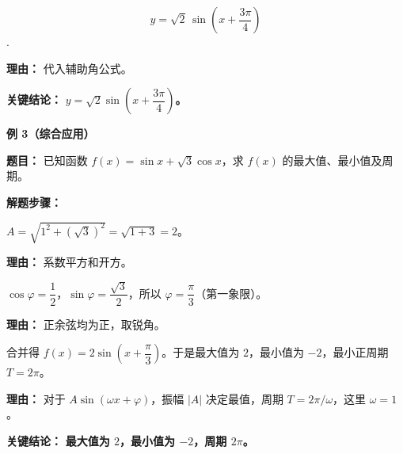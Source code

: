 \begin{examplebox}
\begin{description}[style=nextline, leftmargin=2.8em, labelsep=0.5em, itemsep=0.45em]
		\item[\textbf{第三步（写出合并式）：}]
			\[
				y = \sqrt{2}\,\sin\!\left(x+\frac{3\pi}{4}\right)
			\].
			\par\textbf{理由：} 代入辅助角公式。
	\end{description}

	\textbf{\textcolor{CExample}{关键结论：}}
	\textbf{$y = \sqrt{2}\sin\!\left(x+\dfrac{3\pi}{4}\right)$。}

	\medskip
	\textbf{\textcolor{CExample}{例 3（综合应用）}}

	\textbf{\textcolor{CExample}{题目：}}
	已知函数 $f(x) = \sin x + \sqrt{3}\cos x$，求 $f(x)$ 的最大值、最小值及周期。

	\textbf{\textcolor{CExample}{解题步骤：}}
	\begin{description}[style=nextline, leftmargin=2.8em, labelsep=0.5em, itemsep=0.45em]
		\item[\textbf{第一步（计算振幅）：}] $A = \sqrt{1^{2}+(\sqrt{3})^{2}} = \sqrt{1+3} = 2$。
			\par\textbf{理由：} 系数平方和开方。

		\item[\textbf{第二步（确定辅助角）：}] $\cos\varphi = \dfrac{1}{2}$，$\sin\varphi = \dfrac{\sqrt{3}}{2}$，所以 $\varphi = \dfrac{\pi}{3}$（第一象限）。
			\par\textbf{理由：} 正余弦均为正，取锐角。

		\item[\textbf{第三步（求最值与周期）：}] 合并得 $f(x) = 2\sin\!\left(x+\dfrac{\pi}{3}\right)$。于是最大值为 $2$，最小值为 $-2$，最小正周期 $T = 2\pi$。
			\par\textbf{理由：} 对于 $A\sin(\omega x+\varphi)$，振幅 $|A|$ 决定最值，周期 $T = 2\pi/\omega$，这里 $\omega=1$。
	\end{description}

	\textbf{\textcolor{CExample}{关键结论：}}
	\textbf{最大值为 $2$，最小值为 $-2$，周期 $2\pi$。}
\end{examplebox}
